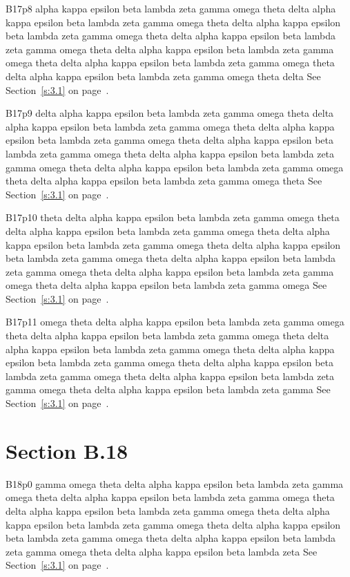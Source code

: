 B17p8 alpha kappa epsilon beta lambda zeta gamma omega theta delta alpha kappa epsilon beta lambda zeta gamma omega theta delta alpha kappa epsilon beta lambda zeta gamma omega theta delta alpha kappa epsilon beta lambda zeta gamma omega theta delta alpha kappa epsilon beta lambda zeta gamma omega theta delta alpha kappa epsilon beta lambda zeta gamma omega theta delta alpha kappa epsilon beta lambda zeta gamma omega theta delta See Section~\ref{s:3.1} on page~\pageref{s:3.1}.

B17p9 delta alpha kappa epsilon beta lambda zeta gamma omega theta delta alpha kappa epsilon beta lambda zeta gamma omega theta delta alpha kappa epsilon beta lambda zeta gamma omega theta delta alpha kappa epsilon beta lambda zeta gamma omega theta delta alpha kappa epsilon beta lambda zeta gamma omega theta delta alpha kappa epsilon beta lambda zeta gamma omega theta delta alpha kappa epsilon beta lambda zeta gamma omega theta See Section~\ref{s:3.1} on page~\pageref{s:3.1}.

B17p10 theta delta alpha kappa epsilon beta lambda zeta gamma omega theta delta alpha kappa epsilon beta lambda zeta gamma omega theta delta alpha kappa epsilon beta lambda zeta gamma omega theta delta alpha kappa epsilon beta lambda zeta gamma omega theta delta alpha kappa epsilon beta lambda zeta gamma omega theta delta alpha kappa epsilon beta lambda zeta gamma omega theta delta alpha kappa epsilon beta lambda zeta gamma omega See Section~\ref{s:3.1} on page~\pageref{s:3.1}.

B17p11 omega theta delta alpha kappa epsilon beta lambda zeta gamma omega theta delta alpha kappa epsilon beta lambda zeta gamma omega theta delta alpha kappa epsilon beta lambda zeta gamma omega theta delta alpha kappa epsilon beta lambda zeta gamma omega theta delta alpha kappa epsilon beta lambda zeta gamma omega theta delta alpha kappa epsilon beta lambda zeta gamma omega theta delta alpha kappa epsilon beta lambda zeta gamma See Section~\ref{s:3.1} on page~\pageref{s:3.1}.

\section{Section B.18}\label{s:B.18}
B18p0 gamma omega theta delta alpha kappa epsilon beta lambda zeta gamma omega theta delta alpha kappa epsilon beta lambda zeta gamma omega theta delta alpha kappa epsilon beta lambda zeta gamma omega theta delta alpha kappa epsilon beta lambda zeta gamma omega theta delta alpha kappa epsilon beta lambda zeta gamma omega theta delta alpha kappa epsilon beta lambda zeta gamma omega theta delta alpha kappa epsilon beta lambda zeta See Section~\ref{s:3.1} on page~\pageref{s:3.1}.

